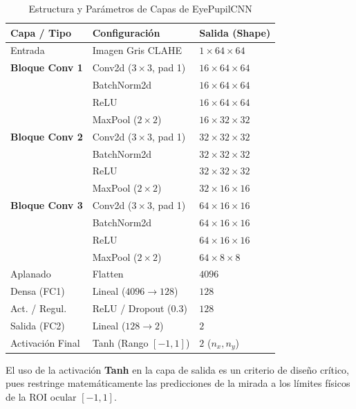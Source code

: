 \documentclass[twocolumn,10pt,letterpaper]{article}
\begin{document}
\begin{table}[H]
\centering
\caption{Estructura y Parámetros de Capas de EyePupilCNN}
\label{tab:cnn_layers}
\scriptsize
\begin{tabular}{p{2.1cm}p{3.2cm}p{2.3cm}}
\toprule
\textbf{Capa / Tipo} & \textbf{Configuración} & \textbf{Salida (Shape)} \\
\midrule
Entrada & Imagen Gris CLAHE & $1 \times 64 \times 64$ \\
\midrule
\textbf{Bloque Conv 1} & Conv2d ($3\times3$, pad 1) & $16 \times 64 \times 64$ \\
 & BatchNorm2d & $16 \times 64 \times 64$ \\
 & ReLU & $16 \times 64 \times 64$ \\
 & MaxPool ($2\times2$) & $16 \times 32 \times 32$ \\
\midrule
\textbf{Bloque Conv 2} & Conv2d ($3\times3$, pad 1) & $32 \times 32 \times 32$ \\
 & BatchNorm2d & $32 \times 32 \times 32$ \\
 & ReLU & $32 \times 32 \times 32$ \\
 & MaxPool ($2\times2$) & $32 \times 16 \times 16$ \\
\midrule
\textbf{Bloque Conv 3} & Conv2d ($3\times3$, pad 1) & $64 \times 16 \times 16$ \\
 & BatchNorm2d & $64 \times 16 \times 16$ \\
 & ReLU & $64 \times 16 \times 16$ \\
 & MaxPool ($2\times2$) & $64 \times 8 \times 8$ \\
\midrule
Aplanado & Flatten & $4096$ \\
Densa (FC1) & Lineal ($4096 \to 128$) & $128$ \\
Act. / Regul. & ReLU / Dropout (0.3) & $128$ \\
Salida (FC2) & Lineal ($128 \to 2$) & $2$ \\
Activación Final & Tanh (Rango $[-1, 1]$) & $2$ ($n_x, n_y$) \\
\bottomrule
\end{tabular}
\end{table}

El uso de la activación \textbf{Tanh} en la capa de salida es un criterio de diseño crítico, pues restringe matemáticamente las predicciones de la mirada a los límites físicos de la ROI ocular $[-1, 1]$.
\end{document}
